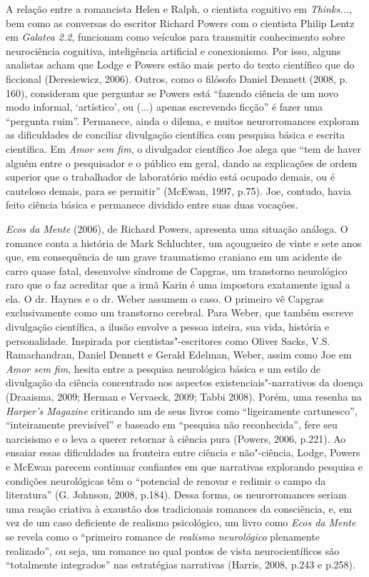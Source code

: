 A relação entre a romancista Helen e Ralph, o cientista cognitivo em
\emph{Thinks...}, bem como as conversas do escritor Richard Powers com o
cientista Philip Lentz em \emph{Galatea 2.2}, funcionam como veículos
para transmitir conhecimento sobre neurociência cognitiva, inteligência
artificial e conexionismo. Por isso, alguns analistas acham que Lodge e
Powers estão mais perto do texto científico que do ficcional
(Deresiewicz, 2006). Outros, como o filósofo Daniel Dennett (2008, p.
160), consideram que perguntar se Powers está ``fazendo ciência de um
novo modo informal, `artístico', ou (...) apenas escrevendo ficção'' é
fazer uma ``pergunta ruim''. Permanece, ainda o dilema, e muitos
neurorromances exploram as dificuldades de conciliar divulgação
científica com pesquisa básica e escrita científica. Em \emph{Amor sem
fim}, o divulgador científico Joe alega que ``tem de haver alguém entre
o pesquisador e o público em geral, dando as explicações de ordem
superior que o trabalhador de laboratório médio está ocupado demais, ou
é cauteloso demais, para se permitir'' (McEwan, 1997, p.75). Joe,
contudo, havia feito ciência básica e permanece dividido entre suas duas
vocações.

\emph{Ecos da Mente} (2006), de Richard Powers, apresenta uma situação
análoga. O romance conta a história de Mark Schluchter, um açougueiro de
vinte e sete anos que, em consequência de um grave traumatismo craniano
em um acidente de carro quase fatal, desenvolve síndrome de Capgras, um
transtorno neurológico raro que o faz acreditar que a irmã Karin é uma
impostora exatamente igual a ela. O dr. Haynes e o dr. Weber assumem o
caso. O primeiro vê Capgras exclusivamente como um transtorno cerebral.
Para Weber, que também escreve divulgação científica, a ilusão envolve a
pessoa inteira, sua vida, história e personalidade. Inspirada por
cientistas"-escritores como Oliver Sacks, V.S. Ramachandran, Daniel
Dennett e Gerald Edelman, Weber, assim como Joe em \emph{Amor sem fim},
hesita entre a pesquisa neurológica básica e um estilo de divulgação da
ciência concentrado nos aspectos existenciais"-narrativos da doença
(Draaisma, 2009; Herman e Vervaeck, 2009; Tabbi 2008). Porém, uma
resenha na \emph{Harper's Magazine} criticando um de seus livros como
``ligeiramente cartunesco'', ``inteiramente previsível'' e baseado em
``pesquisa não reconhecida'', fere seu narcisismo e o leva a querer
retornar à ciência pura (Powers, 2006, p.221). Ao ensaiar essas
dificuldades na fronteira entre ciência e não"-ciência, Lodge, Powers e
McEwan parecem continuar confiantes em que narrativas explorando
pesquisa e condições neurológicas têm o ``potencial de renovar e redimir
o campo da literatura'' (G. Johnson, 2008, p.184). Dessa forma, os
neurorromances seriam uma reação criativa à exaustão dos tradicionais
romances da consciência, e, em vez de um caso deficiente de realismo
psicológico, um livro como \emph{Ecos da Mente} se revela como o
``primeiro romance de \emph{realismo neurológico} plenamente
realizado'', ou seja, um romance no qual pontos de vista
neurocientíficos são ``totalmente integrados'' nas estratégias
narrativas (Harris, 2008, p.243 e p.258).

